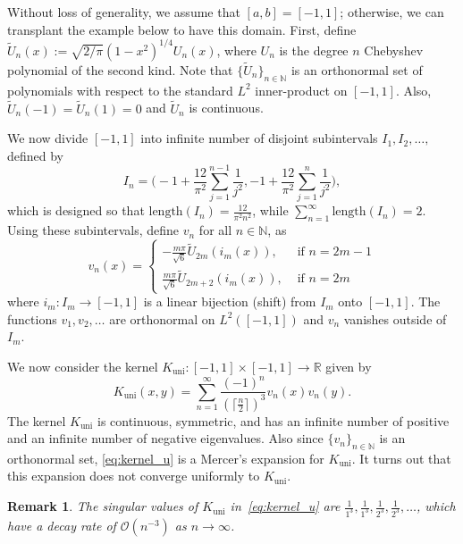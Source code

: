 \documentclass{article}
\newtheorem{remark}{Remark}
\begin{document}
Without loss of generality, we assume that $[a,b]=[-1,1]$; otherwise, we can transplant the example below to have this domain. First, define $\tilde{U}_n(x) := \sqrt{2/\pi}(1-x^2)^{1/4} U_n(x)$, where $U_n$ is the degree $n$ Chebyshev polynomial of the second kind. Note that $\{\tilde{U}_n\}_{n\in\mathbb{N}}$ is an orthonormal set of polynomials with respect to the standard $L^2$ inner-product on $[-1, 1]$. Also, $\tilde{U}_n(-1) = \tilde{U}_n(1) = 0$ and $\tilde{U}_n$ is continuous. 

We now divide $[-1, 1]$ into infinite number of disjoint subintervals $I_1, I_2, \dots, $ defined by
\begin{equation*}
    I_n = \Big(-1+\frac{12}{\pi^2}\sum_{j=1}^{n-1}\frac{1}{j^2}, -1+\frac{12}{\pi^2}\sum_{j=1}^{n}\frac{1}{j^2} \Big),
\end{equation*}
which is designed so that $\text{length}(I_n) = \frac{12}{\pi^2n^2}$, while $\sum_{n=1}^\infty\text{length}(I_n)=2$. Using these subintervals, define $v_n$ for all $n\in\mathbb{N}$, as
\begin{equation}\label{eq:definitionvn}
    v_n(x) = \left\{\begin{array}{ll}\displaystyle -\frac{m\pi}{\sqrt{6}} \tilde{U}_{2m}( i_m(x)), & \text{ if }n = 2m-1\\
    \displaystyle \frac{m\pi}{\sqrt{6}} \tilde{U}_{2m+2}( i_m(x)), & \text{ if }n = 2m\end{array}\right.
\end{equation}
where $i_m:I_m\to [-1, 1]$ is a linear bijection (shift) from $I_m$ onto $[-1, 1]$. The functions $v_1, v_2, \dots$ are orthonormal on $L^2([-1,1])$ and $v_n$ vanishes outside of $I_m$. 

We now consider the kernel $K_\text{uni}:[-1, 1]\times [-1, 1]\to \mathbb{R}$ given by  
\begin{equation}\label{eq:kernel_u}
    K_{\text{uni}}(x, y) = \sum_{n=1}^\infty \frac{(-1)^n}{(\lceil\frac{n}{2}\rceil)^3} v_n(x)v_n(y).
\end{equation}
The kernel $K_{\text{uni}}$ is continuous, symmetric, and has an infinite number of positive and an infinite number of negative eigenvalues. Also since $\{v_n\}_{n\in\mathbb{N}}$ is an orthonormal set, \cref{eq:kernel_u} is a Mercer's expansion for $K_{\text{uni}}$. It turns out that this expansion does not converge uniformly to $K_{\text{uni}}$. 

\begin{remark}
    The singular values of $K_{\text{uni}}$ in~\cref{eq:kernel_u} are $\frac{1}{1^3}, \frac{1}{1^3}, \frac{1}{2^3}, \frac{1}{2^3}, \dots$, which have a decay rate of $\mathcal{O}(n^{-3})$ as $n\to\infty$. 
\end{remark}
\end{document}
